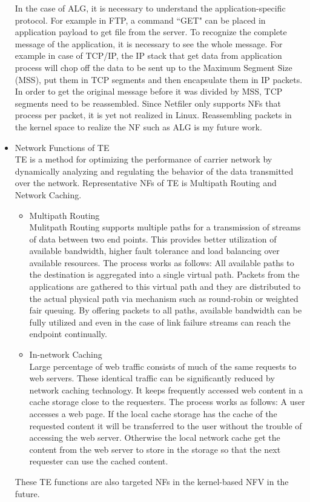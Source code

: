 \begin{itemize}
		In the case of ALG, it is necessary to understand the application-specific protocol. For example in FTP, a command ``GET" can be placed in application payload to get file from the server. To recognize the complete message of the application, it is necessary to see the whole message. For example in case of TCP/IP, the IP stack that get data from application process will chop off the data to be sent up to the Maximum Segment Size (MSS), put them in TCP segments and then encapsulate them in IP packets. In order to get the original message before it was divided by MSS, TCP segments need to be reassembled. Since Netfiler only supports NFs that process per packet, it is yet not realized in Linux. Reassembling packets in the kernel space to realize the NF such as ALG is my future work.
		
	\item Network Functions of TE\\
		TE is a method for optimizing the performance of carrier network by dynamically analyzing and regulating the behavior of the data transmitted over the network. Representative NFs of TE is Multipath Routing and Network Caching. 
		\begin{itemize}
			\item Multipath Routing\\
				Mulitpath Routing supports multiple paths for a transmission of streams of data between two end points. This provides better utilization of available bandwidth, higher fault tolerance and load balancing over available resources. The process works as follows: All available paths to the destination is aggregated into a single virtual path. Packets from the applications are gathered to this virtual path and they are distributed to the actual physical path via mechanism such as round-robin or weighted fair queuing. By offering packets to all paths, available bandwidth can be fully utilized and even in the case of link failure streams can reach the endpoint continually.  
			\item In-network Caching\\
				Large percentage of web traffic consists of much of the same requests to web servers. These identical traffic can be significantly reduced by network caching technology. It keeps frequently accessed web content in a cache storage close to the requesters. The process works as follows: A user accesses a web page. If the local cache storage has the cache of the requested content it will be transferred to the user without the trouble of accessing the web server. Otherwise the local network cache get the content from the web server to store in the storage so that the next requester can use the cached content. 
		\end{itemize}
		These TE functions are also targeted NFs in the kernel-based NFV in the future. 
\end{itemize}

